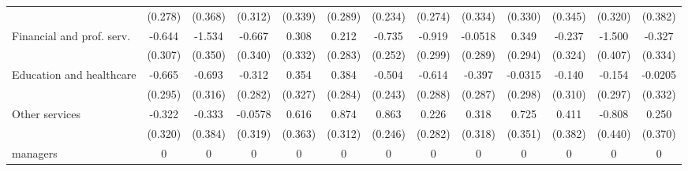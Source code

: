 {\begin{tabular}{l*{12}{c}}
                    &     (0.278)         &     (0.368)         &     (0.312)         &     (0.339)         &     (0.289)         &     (0.234)         &     (0.274)         &     (0.334)         &     (0.330)         &     (0.345)         &     (0.320)         &     (0.382)         \\
[1em]
Financial and prof. serv.&      -0.644\sym{*}  &      -1.534\sym{***}&      -0.667\sym{*}  &       0.308         &       0.212         &      -0.735\sym{**} &      -0.919\sym{**} &     -0.0518         &       0.349         &      -0.237         &      -1.500\sym{***}&      -0.327         \\
                    &     (0.307)         &     (0.350)         &     (0.340)         &     (0.332)         &     (0.283)         &     (0.252)         &     (0.299)         &     (0.289)         &     (0.294)         &     (0.324)         &     (0.407)         &     (0.334)         \\
[1em]
Education and healthcare&      -0.665\sym{*}  &      -0.693\sym{*}  &      -0.312         &       0.354         &       0.384         &      -0.504\sym{*}  &      -0.614\sym{*}  &      -0.397         &     -0.0315         &      -0.140         &      -0.154         &     -0.0205         \\
                    &     (0.295)         &     (0.316)         &     (0.282)         &     (0.327)         &     (0.284)         &     (0.243)         &     (0.288)         &     (0.287)         &     (0.298)         &     (0.310)         &     (0.297)         &     (0.332)         \\
[1em]
Other services      &      -0.322         &      -0.333         &     -0.0578         &       0.616         &       0.874\sym{**} &       0.863\sym{***}&       0.226         &       0.318         &       0.725\sym{*}  &       0.411         &      -0.808         &       0.250         \\
                    &     (0.320)         &     (0.384)         &     (0.319)         &     (0.363)         &     (0.312)         &     (0.246)         &     (0.282)         &     (0.318)         &     (0.351)         &     (0.382)         &     (0.440)         &     (0.370)         \\
[1em]
managers            &           0         &           0         &           0         &           0         &           0         &           0         &           0         &           0         &           0         &           0         &           0         &           0         \\

\end{tabular}}
